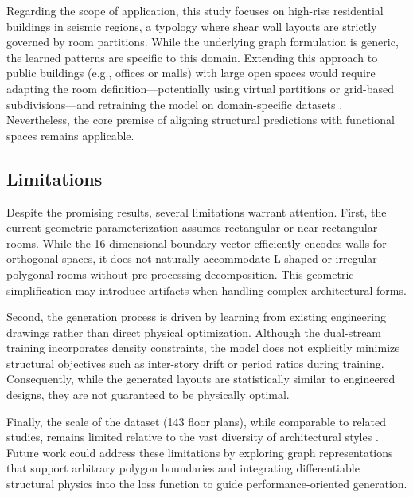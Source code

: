 Regarding the scope of application, this study focuses on high-rise residential buildings in seismic regions, a typology where shear wall layouts are strictly governed by room partitions. While the underlying graph formulation is generic, the learned patterns are specific to this domain. Extending this approach to public buildings (e.g., offices or malls) with large open spaces would require adapting the room definition---potentially using virtual partitions or grid-based subdivisions---and retraining the model on domain-specific datasets \cite{Claessens_2020,Langenhan_2013}. Nevertheless, the core premise of aligning structural predictions with functional spaces remains applicable.

\subsection{Limitations}
\label{subsec:limitations}

Despite the promising results, several limitations warrant attention. First, the current geometric parameterization assumes rectangular or near-rectangular rooms. While the 16-dimensional boundary vector efficiently encodes walls for orthogonal spaces, it does not naturally accommodate L-shaped or irregular polygonal rooms without pre-processing decomposition. This geometric simplification may introduce artifacts when handling complex architectural forms.

Second, the generation process is driven by learning from existing engineering drawings rather than direct physical optimization. Although the dual-stream training incorporates density constraints, the model does not explicitly minimize structural objectives such as inter-story drift or period ratios during training. Consequently, while the generated layouts are statistically similar to engineered designs, they are not guaranteed to be physically optimal.

Finally, the scale of the dataset (143 floor plans), while comparable to related studies, remains limited relative to the vast diversity of architectural styles \cite{liaoAutomatedStructuralDesign2021a,zhaoIntelligentDesignShear2023b,guIntelligentDesignShear2024}. Future work could address these limitations by exploring graph representations that support arbitrary polygon boundaries and integrating differentiable structural physics into the loss function to guide performance-oriented generation.
